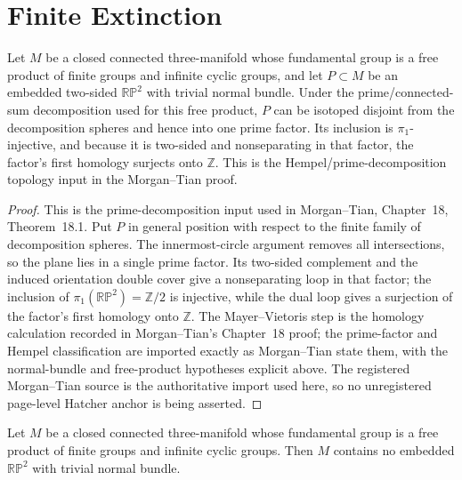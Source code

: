 \section{Finite Extinction}

\begin{lemma}
\label{lem:projective-plane-prime-factor-contract}
\notready
Let $M$ be a closed connected three-manifold whose fundamental group is a
free product of finite groups and infinite cyclic groups, and let $P\subset M$
be an embedded two-sided $\mathbb{RP}^2$ with trivial normal bundle.  Under
the prime/connected-sum decomposition used for this free product, $P$ can be
isotoped disjoint from the decomposition spheres and hence into one prime
factor.  Its inclusion is $\pi _1$-injective, and because it is two-sided and
nonseparating in that factor, the factor's first homology surjects onto
$\mathbb Z$.  This is the Hempel/prime-decomposition topology input in the
Morgan--Tian proof.
\end{lemma}

\begin{proof}
This is the prime-decomposition input used in Morgan--Tian, Chapter~18,
Theorem~18.1.  Put $P$ in general position with respect to the finite family
of decomposition spheres.  The innermost-circle argument removes all
intersections, so the plane lies in a single prime factor.  Its two-sided
complement and the induced orientation double cover give a nonseparating loop
in that factor; the inclusion of $\pi_1(\mathbb{RP}^2)=\mathbb Z/2$ is
injective, while the dual loop gives a surjection of the factor's first
homology onto $\mathbb Z$.  The Mayer--Vietoris step is the homology
calculation recorded in Morgan--Tian's Chapter~18 proof; the prime-factor and
Hempel classification are imported exactly as Morgan--Tian state them, with
the normal-bundle and free-product hypotheses explicit above.  The registered
Morgan--Tian source is the authoritative import used here, so no unregistered
page-level Hatcher anchor is being asserted.
\end{proof}

\begin{theorem}
\label{thm:free-product-excludes-two-sided-projective-plane}
\notready
Let $M$ be a closed connected three-manifold whose
fundamental group is a free product of finite groups and infinite cyclic
groups.  Then $M$ contains no embedded $\mathbb{RP}^2$ with trivial normal
bundle.
\end{theorem}

